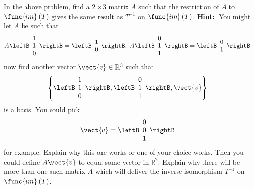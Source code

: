 \begin{enumialphparenastyle}
\begin{ex} In the above problem, find a $2\times 3$ matrix $A$ such that the
restriction of $A$ to $\func{im}\left( T\right) $ gives the same result as $
T^{-1}$ on $\func{im}\left( T\right) $. \textbf{Hint:\ }You might let $A$ be
such that 
\begin{equation*}
A\leftB 
\begin{array}{c}
1 \\ 
1 \\ 
0
\end{array}
\rightB =\leftB 
\begin{array}{c}
1 \\ 
0
\end{array}
\rightB ,\ A\leftB 
\begin{array}{c}
0 \\ 
1 \\ 
1
\end{array}
\rightB =\leftB 
\begin{array}{c}
0 \\ 
1
\end{array}
\rightB
\end{equation*}
now find another vector $\vect{v}\in \mathbb{R}^{3}$ such that 
\begin{equation*}
\left\{ \leftB 
\begin{array}{c}
1 \\ 
1 \\ 
0
\end{array}
\rightB ,\leftB 
\begin{array}{c}
0 \\ 
1 \\ 
1
\end{array}
\rightB ,\vect{v}\right\}
\end{equation*}
is a basis. You could pick 
\begin{equation*}
\vect{v}=\leftB 
\begin{array}{c}
0 \\ 
0 \\ 
1
\end{array}
\rightB
\end{equation*}
for example. Explain why this one works or one of your choice works. Then
you could define $A\vect{v}$ to equal some vector in $\mathbb{R}^{2}.$
Explain why there will be more than one such matrix $A$ which will deliver
the inverse isomorphism $T^{-1}$ on $\func{im}\left( T\right) $.
\end{ex}



\end{enumialphparenastyle}

